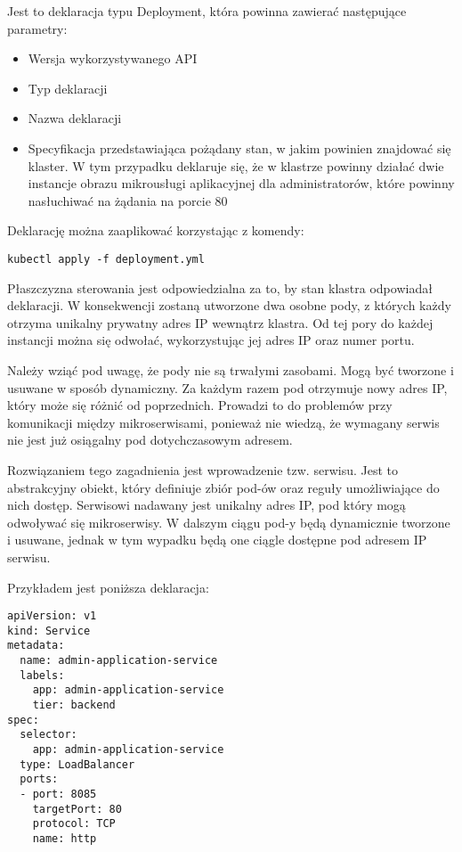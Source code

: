 Jest to deklaracja typu Deployment, która powinna zawierać następujące parametry:

\begin{itemize} %
    \item Wersja wykorzystywanego API
    \item Typ deklaracji
    \item Nazwa deklaracji
    \item Specyfikacja przedstawiająca pożądany stan, w jakim powinien znajdować się 
    klaster. W tym przypadku deklaruje się, że w klastrze powinny działać dwie 
    instancje obrazu mikrousługi aplikacyjnej dla administratorów, które powinny 
    nasłuchiwać na żądania na porcie 80
\end{itemize}

Deklarację można zaaplikować korzystając z komendy:

\begin{lstlisting}
kubectl apply -f deployment.yml
\end{lstlisting}

Płaszczyzna sterowania jest odpowiedzialna za to, by stan klastra odpowiadał 
deklaracji. W konsekwencji zostaną utworzone dwa osobne pody, z których każdy otrzyma 
unikalny prywatny adres IP wewnątrz klastra. Od tej pory do każdej instancji można 
się odwołać, wykorzystując jej adres IP oraz numer portu.

Należy wziąć pod uwagę, że pody nie są trwałymi zasobami. Mogą być tworzone i usuwane 
w sposób dynamiczny. Za każdym razem pod otrzymuje nowy adres IP, który może się 
różnić od poprzednich. Prowadzi to do problemów przy komunikacji między 
mikroserwisami, ponieważ nie wiedzą, że wymagany serwis nie jest już osiągalny pod 
dotychczasowym adresem.

Rozwiązaniem tego zagadnienia jest wprowadzenie tzw. serwisu. Jest to abstrakcyjny 
obiekt, który definiuje zbiór pod-ów oraz reguły umożliwiające do nich dostęp. 
Serwisowi nadawany jest unikalny adres IP, pod który mogą odwoływać się mikroserwisy. 
W dalszym ciągu pod-y będą dynamicznie tworzone i usuwane, jednak w tym wypadku będą 
one ciągle dostępne pod adresem IP serwisu.

Przykładem jest poniższa deklaracja:

\begin{lstlisting}
apiVersion: v1
kind: Service
metadata:
  name: admin-application-service
  labels:
    app: admin-application-service
    tier: backend
spec:
  selector:
    app: admin-application-service
  type: LoadBalancer
  ports:
  - port: 8085
    targetPort: 80
    protocol: TCP
    name: http 
\end{lstlisting}

